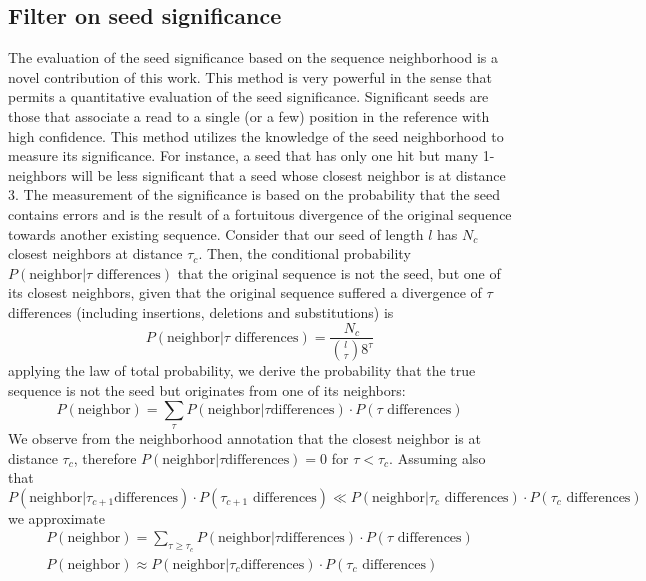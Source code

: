 \subsection{Filter on seed significance}
The evaluation of the seed significance based on the sequence
neighborhood is a novel contribution of this work. This method is very
powerful in the sense that permits a quantitative evaluation of the
seed significance. Significant seeds are those that associate a read
to a single (or a few) position in the reference with high
confidence. This method utilizes the knowledge of the seed
neighborhood to measure its significance. For instance, a seed that
has only one hit but many 1-neighbors will be less significant that a
seed whose closest neighbor is at distance 3. The measurement of the
significance is based on the probability that the seed contains errors
and is the result of a fortuitous divergence of the original sequence
towards another existing sequence. Consider that our seed of length
$l$ has $N_c$ closest neighbors at distance $\tau_c$. Then, the
conditional probability $P(\mbox{neighbor}|\tau\mbox{ differences})$
that the original sequence is not the seed, but one of its closest
neighbors, given that the original sequence suffered a divergence of
$\tau$ differences (including insertions, deletions and substitutions)
is 
\begin{equation}
  P(\mbox{neighbor}|\tau\mbox{ differences}) = \frac{N_c}{{{l}\choose{\tau}}8^{\tau}}
\end{equation}
applying the law of total probability, we derive the probability that
the true sequence is not the seed but originates from one of its
neighbors:
\begin{equation}
  P(\mbox{neighbor}) = \sum_{\tau}{P(\mbox{neighbor}|\tau\mbox{
      differences})\cdot P(\tau\mbox{ differences})}
\end{equation}
We observe from the neighborhood annotation that the closest neighbor is
at distance $\tau_c$, therefore $P(\mbox{neighbor}|\tau\mbox{
differences}) = 0$ for $\tau < \tau_c$. Assuming also that
\begin{equation*}
 P(\mbox{neighbor}|\tau_{c+1}\mbox{differences}) \cdot
 P(\tau_{c+1}\mbox{ differences}) \ll
 P(\mbox{neighbor}|\tau_c\mbox{ differences}) \cdot
 P(\tau_c\mbox{ differences})
\end{equation*}
we approximate 
\begin{equation}
  \begin{array}{c}
  P(\mbox{neighbor}) = \sum_{\tau \ge \tau_c}{P(\mbox{neighbor}|\tau\mbox{
      differences})\cdot P(\tau\mbox{ differences})} \\
  P(\mbox{neighbor}) \approx P(\mbox{neighbor}|\tau_c\mbox{
      differences})\cdot P(\tau_c\mbox{ differences})
  \end{array}
\end{equation}
